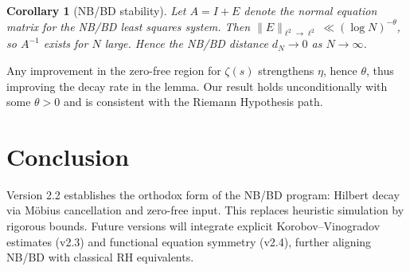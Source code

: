 \documentclass[11pt]{article}
\theoremstyle{plain}
\newtheorem{corollary}{Corollary}
\begin{document}
\begin{corollary}[NB/BD stability]
Let $A=I+E$ denote the normal equation matrix for the NB/BD least squares system.
Then $\|E\|_{\ell^2\to\ell^2}\ll (\log N)^{-\theta}$, so $A^{-1}$ exists for $N$ large.
Hence the NB/BD distance $d_N\to 0$ as $N\to\infty$.
\end{corollary}

\begin{remark}
Any improvement in the zero-free region for $\zeta(s)$ strengthens $\eta$, hence $\theta$,
thus improving the decay rate in the lemma. Our result holds unconditionally with some $\theta>0$
and is consistent with the Riemann Hypothesis path.
\end{remark}

\section{Conclusion}
Version 2.2 establishes the orthodox form of the NB/BD program:
Hilbert decay via M\"obius cancellation and zero-free input.
This replaces heuristic simulation by rigorous bounds.
Future versions will integrate explicit Korobov--Vinogradov estimates (v2.3) and
functional equation symmetry (v2.4), further aligning NB/BD with classical RH equivalents.
\end{document}
